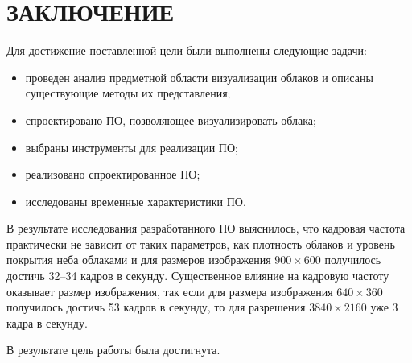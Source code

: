 \chapter*{ЗАКЛЮЧЕНИЕ}

Для достижение поставленной цели были выполнены следующие задачи:
\begin{itemize}
	\item проведен анализ предметной области визуализации облаков и описаны существующие методы их представления;
	\item спроектировано ПО, позволяющее визуализировать облака;
	\item выбраны инструменты для реализации ПО;
	\item реализовано спроектированное ПО;
	\item исследованы временные характеристики ПО.
\end{itemize}

В результате исследования разработанного ПО выяснилось, что кадровая частота практически не зависит от таких параметров, как плотность облаков и уровень покрытия неба облаками и для размеров изображения $900 \times 600$ получилось достичь 32--34 кадров в секунду.
Существенное влияние на кадровую частоту оказывает размер изображения, так если для размера изображения $640 \times 360$ получилось достичь 53 кадров в секунду, то для разрешения $3840 \times 2160$ уже 3 кадра в секунду.

В результате цель работы была достигнута.


